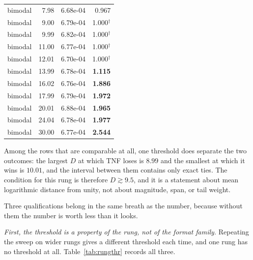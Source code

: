 \begin{table}[htbp]
\begin{tabular}{lrrr}
bimodal & 7.98 & 6.68e-04 & 0.967 \\
bimodal & 9.00 & 6.79e-04 & 1.000$^{\dagger}$ \\
bimodal & 9.99 & 6.82e-04 & 1.000$^{\dagger}$ \\
bimodal & 11.00 & 6.77e-04 & 1.000$^{\dagger}$ \\
bimodal & 12.01 & 6.70e-04 & 1.000$^{\dagger}$ \\
bimodal & 13.99 & 6.78e-04 & \textbf{1.115} \\
bimodal & 16.02 & 6.76e-04 & \textbf{1.886} \\
bimodal & 17.99 & 6.79e-04 & \textbf{1.972} \\
bimodal & 20.01 & 6.88e-04 & \textbf{1.965} \\
bimodal & 24.04 & 6.78e-04 & \textbf{1.977} \\
bimodal & 30.00 & 6.77e-04 & \textbf{2.544} \\
\hline
\end{tabular}
\end{table}

Among the rows that are comparable at all, one threshold does separate the two
outcomes: the largest $D$ at which TNF loses is $8.99$ and the smallest at which
it wins is $10.01$, and the interval between them contains only exact ties. The
condition for this rung is therefore $D \gtrsim 9.5$, and it is a statement about
mean logarithmic distance from unity, not about magnitude, span, or tail weight.

Three qualifications belong in the same breath as the number, because without
them the number is worth less than it looks.

\emph{First, the threshold is a property of the rung, not of the format family.}
Repeating the sweep on wider rungs gives a different threshold each time, and one
rung has no threshold at all. Table~\ref{tab:rungthr} records all three.


